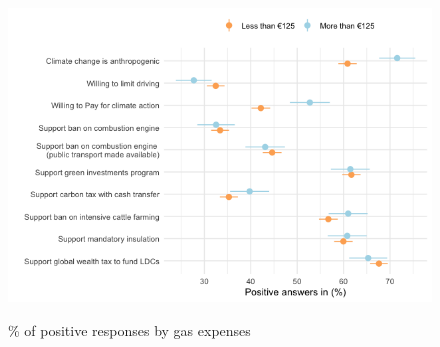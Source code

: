 	\begin{frame}{}%
	\begin{figure}[h!]
	\caption{\% of positive responses by gas expenses}
	\includegraphics[width=.7\paperwidth]{../figures/FR/positive_all_by_gas_expenses_FR.png} \\
	\end{figure}
	\end{frame}
	
	

